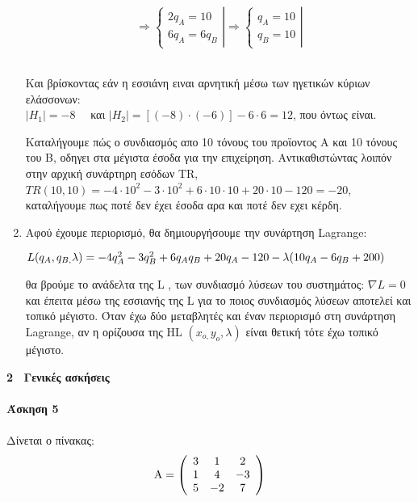 \documentclass[12pt,a4paper]{article}
\begin{document}
\begin{enumerate}
\[ \Rightarrow \left\{ {\left. {\begin{array}{*{20}{c}}
{2{q_A} = 10}\\
{6{q_A} = 6{q_B}}
\end{array}} \right|} \right. \Rightarrow \left\{ {\left. {\begin{array}{*{20}{c}}
{{q_A} = 10}\\
{{q_B} = 10}
\end{array}} \right|} \right.\] \\

\begin{center}
Και βρίσκοντας εάν η εσσιάνη ειναι αρνητική μέσω των ηγετικών κύριων ελάσσονων:\\

$|H_1| =  - 8$ \ \ και $|Η_2| = [(-8) \cdot (-6)] - 6 \cdot 6= 12$, που όντως είναι.\\
\end{center}

Καταλήγουμε πώς ο συνδιασμός απο 10 τόνους του προϊοντος Α και 10 τόνους του Β, οδηγει στα μέγιστα έσοδα για την επιχείρηση. Αντικαθιστώντας λοιπόν στην αρχική συνάρτηρη εσόδων \textlatin{TR}, $TR(10,10) = -4\cdot10^2 - 3\cdot10^2 + 6\cdot10 \cdot 10 + 20 \cdot 10 - 120 = - 20$, καταλήγουμε πως ποτέ δεν έχει έσοδα αρα και ποτέ δεν εχει κέρδη.\\
\item Αφού έχουμε περιορισμό, θα δημιουργήσουμε την συνάρτηση \textlatin{Lagrange}: \\
\begin{center}
$L({q_A},{q_{B,}}\lambda ) =  - 4q_A^2 - 3q_B^2 + 6{q_A}{q_B} + 20{q_A} - 120 - \lambda ({\rm{1}}0{q_A} - {\rm{6}}{q_B} + {\rm{2}}00)$ 
\end{center} 
θα βρούμε το ανάδελτα της \textlatin{L} , των συνδιασμό λύσεων του συστημάτος: $\nabla L = 0 $ και έπειτα μέσω της εσσιανής της \textlatin{L} για το ποιος συνδιασμός λύσεων αποτελεί και τοπικό μέγιστο. Όταν έχω δύο μεταβλητές και έναν περιορισμό στη συνάρτηση \textlatin{Lagrange}, αν η ορίζουσα της \textlatin{HL} $({x_{o,}}{y_o},\lambda )$ είναι θετική τότε έχω τοπικό μέγιστο.
\end{enumerate}
\newpage
\textbf{{\Large 2 \ Γενικές ασκήσεις}}\\\\
\textbf{Άσκηση 5}\\\\
Δίνεται ο πίνακας:
\[{\rm A} = \left( {\begin{array}{*{20}{c}}
3&1&2\\
1&4&{ - 3}\\
5&{ - 2}&7
\end{array}} \right)\]
\end{document}
